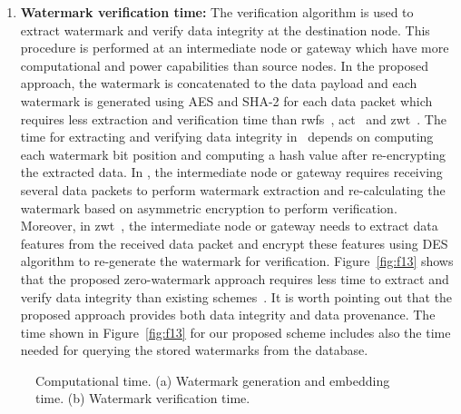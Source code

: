 \documentclass{llncs}
\begin{document}
\begin{enumerate}
\item \textbf{Watermark verification time:} The verification algorithm is used to extract watermark and verify data integrity at the destination node. This procedure is performed at an intermediate node or gateway which have more computational and power capabilities than source nodes. In the proposed approach, the watermark is concatenated to the data payload and each watermark is generated using AES and SHA-2 for each data packet which requires less extraction and verification time than \gls*{rwfs}~\cite{Alromith2018}, \gls*{act}~\cite{Sun2013} and \gls*{zwt}~\cite{hameed2018}. The time for extracting and verifying data integrity in~\cite{Alromith2018} depends on computing each watermark bit position and computing a hash value after re-encrypting the extracted data. In \cite{Sun2013}, the intermediate node or gateway requires receiving several data packets to perform watermark extraction and re-calculating the watermark based on asymmetric encryption to perform verification. Moreover, in \gls*{zwt}~\cite{hameed2018}, the intermediate node or gateway needs to extract data features from the received data packet and encrypt these features using DES algorithm to re-generate the watermark for verification. Figure~\ref{fig:f13} shows that the proposed zero-watermark approach requires less time to extract and verify data integrity than existing schemes~\cite{Alromith2018,Sun2013,hameed2018}. It is worth pointing out that the proposed approach provides both data integrity and data provenance. The time shown in Figure~\ref{fig:f13} for our proposed scheme includes also the time needed for querying the stored watermarks from the database.  
\end{enumerate}


\begin{figure*}[!htbp]
  \centering
  \hfill
  \caption{Computational time. (a) Watermark generation and embedding time. (b) Watermark verification time.}
\end{figure*}
\end{document}
